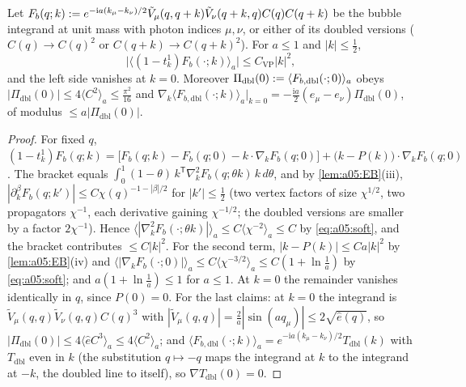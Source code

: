 \begin{lemma}\label{lem:a05:VPR}
Let $F_b(q;k):= e^{-\mathrm ia(k_\mu-k_\nu)/2}\tilde V_\mu(q,q+k)\tilde V_\nu(q+k,q)C(q)C(q+k)$ be the bubble integrand at unit mass with photon indices $\mu,\nu$, or either of its doubled versions ($C(q)\to C(q)^2$ or $C(q+k)\to C(q+k)^2$). For $a\le1$ and $|k|\le\frac12$,
\[
\big|\big\langle(1-t^1_k)F_b(\cdot;k)\big\rangle_a\big|\le C_{\mathrm{VP}}|k|^2,
\]
and the left side vanishes at $k=0$. Moreover $\Pi_{\mathrm{dbl}}(0):=\langle F_{b,\mathrm{dbl}}(\cdot;0)\rangle_a$ obeys $|\Pi_{\mathrm{dbl}}(0)|\le4\langle C^2\rangle_a\le\frac{\pi^2}{16}$ and $\nabla_k\langle F_{b,\mathrm{dbl}}(\cdot;k)\rangle_a\big|_{k=0}=-\frac{\mathrm ia}2(e_\mu-e_\nu)\Pi_{\mathrm{dbl}}(0)$, of modulus $\le a|\Pi_{\mathrm{dbl}}(0)|$.
\end{lemma}
\begin{proof}
For fixed $q$, $(1-t^1_k)F_b(q;k)=\big[F_b(q;k)-F_b(q;0)-k\cdot\nabla_kF_b(q;0)\big]+\big(k-P(k)\big)\cdot\nabla_kF_b(q;0)$. The bracket equals $\int_0^1(1-\theta)\,k^{\mathsf T}\nabla_k^2F_b(q;\theta k)\,k\,d\theta$, and by \cref{lem:a05:EB}(iii), $|\partial^\beta_kF_b(q;k')|\le C\chi(q)^{-1-|\beta|/2}$ for $|k'|\le\frac12$ (two vertex factors of size $\chi^{1/2}$, two propagators $\chi^{-1}$, each derivative gaining $\chi^{-1/2}$; the doubled versions are smaller by a factor $2\chi^{-1}$). Hence $\langle|\nabla^2_kF_b(\cdot;\theta k)|\rangle_a\le C\langle\chi^{-2}\rangle_a\le C$ by \eqref{eq:a05:soft}, and the bracket contributes $\le C|k|^2$. For the second term, $|k-P(k)|\le Ca|k|^2$ by \cref{lem:a05:EB}(iv) and $\langle|\nabla_kF_b(\cdot;0)|\rangle_a\le C\langle\chi^{-3/2}\rangle_a\le C(1+\ln\frac1a)$ by \eqref{eq:a05:soft}; and $a(1+\ln\frac1a)\le1$ for $a\le1$. At $k=0$ the remainder vanishes identically in $q$, since $P(0)=0$. For the last claims: at $k=0$ the integrand is $\tilde V_\mu(q,q)\tilde V_\nu(q,q)C(q)^3$ with $|\tilde V_\mu(q,q)|=\frac2a|\sin(aq_\mu)|\le2\sqrt{\hat e(q)}$, so $|\Pi_{\mathrm{dbl}}(0)|\le4\langle\hat eC^3\rangle_a\le4\langle C^2\rangle_a$; and $\langle F_{b,\mathrm{dbl}}(\cdot;k)\rangle_a=e^{-\mathrm ia(k_\mu-k_\nu)/2}T_{\mathrm{dbl}}(k)$ with $T_{\mathrm{dbl}}$ even in $k$ (the substitution $q\mapsto-q$ maps the integrand at $k$ to the integrand at $-k$, the doubled line to itself), so $\nabla T_{\mathrm{dbl}}(0)=0$.
\end{proof}

